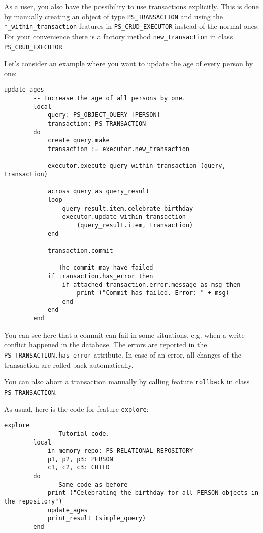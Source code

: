 \documentclass[a4paper,12pt]{report}
\begin{document}
As a user, you also have the possibility to use transactions explicitly. 
This is done by manually creating an object of type \lstinline!PS_TRANSACTION! and using the \lstinline!*_within_transaction! features in \lstinline!PS_CRUD_EXECUTOR! instead of the normal ones.
For your convenience there is a factory method \lstinline{new_transaction} in class \lstinline!PS_CRUD_EXECUTOR!.

Let's consider an example where you want to update the age of every person by one:

\begin{lstlisting}[language=OOSC2Eiffel, captionpos=b, caption={}, label={lst:update_all_ages}]
	update_ages
		-- Increase the age of all persons by one.
		local
			query: PS_OBJECT_QUERY [PERSON]
			transaction: PS_TRANSACTION
		do
			create query.make
			transaction := executor.new_transaction

			executor.execute_query_within_transaction (query, transaction)

			across query as query_result
			loop
				query_result.item.celebrate_birthday
				executor.update_within_transaction 
					(query_result.item, transaction)
			end

			transaction.commit

			-- The commit may have failed
			if transaction.has_error then
				if attached transaction.error.message as msg then
					print ("Commit has failed. Error: " + msg)
				end
			end
		end
\end{lstlisting}

You can see here that a commit can fail in some situations, e.g. when a write conflict happened in the database.
The errors are reported in the \lstinline!PS_TRANSACTION.has_error! attribute.
In case of an error, all changes of the transaction are rolled back automatically.

You can also abort a transaction manually by calling feature \lstinline{rollback} in class \lstinline{PS_TRANSACTION}.

As usual, here is the code for feature \lstinline{explore}:
\begin{lstlisting}[language=OOSC2Eiffel, captionpos=b, caption={Testing an update with explicit transaction.}, label={lst:explicit_transactions_update}]
	explore
			-- Tutorial code.
		local
			in_memory_repo: PS_RELATIONAL_REPOSITORY
			p1, p2, p3: PERSON
			c1, c2, c3: CHILD
		do
			-- Same code as before
			print ("Celebrating the birthday for all PERSON objects in the repository")
			update_ages
			print_result (simple_query)
		end
\end{lstlisting}
\end{document}
